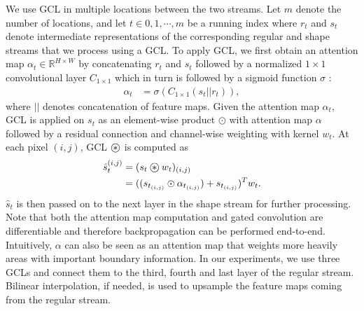 \documentclass[10pt,twocolumn,letterpaper]{article}
\newcommand{\incircbin}[1]{\mathbin{\mathchoice {\protect\incircint{\displaystyle}{#1}}{\protect\incircint{\textstyle}{#1}}{\protect\incircint{\scriptstyle}{#1}}{\protect\incircint{\scriptscriptstyle}{#1}}}}
\newcommand{\incircint}[2]{\ooalign{$#1\bigcirc$\crcr\hidewidth$#1#2$\hidewidth\crcr}}
\newcommand{\gatedconv}{\incircbin{*}}
\begin{document}
We use GCL in multiple locations between the two streams.  Let $m$ denote the number of locations, and 
let $t \in {0,1,\cdots,m}$ be a running index where $r_t$ and $s_t$ denote intermediate representations of the corresponding regular and shape streams that we process using a GCL.
To apply GCL, we first obtain an attention map $\alpha_t \in \mathbb{R}^{H\times W}$ by concatenating $r_t$ and $s_t$ followed by a normalized $1\times1$ convolutional layer $C_{1\times1}$ which in turn is followed by a sigmoid function $\sigma$ :
\vspace{-2mm}
\begin{align}
    \alpha_t &= \sigma(C_{1\times1}(s_t || r_t)), \label{eqn:attention}
\end{align}
where $||$ denotes concatenation of feature maps.
Given the attention map $\alpha_t$, GCL is applied on $s_t$ as an element-wise product $\odot$ with attention map $\alpha$ followed by a residual connection and channel-wise weighting with kernel $w_t$. At each pixel $(i,j)$, GCL $\gatedconv$ is computed as
\vspace{-2mm}
\begin{align}
\begin{aligned}
\hat{s}_{t}^{(i,j)}& = {(s_t \gatedconv w_t)_{(i,j)}}  \\
	           & = ((s_{t_{(i,j)}} \odot \alpha_{t_{(i,j)}}) + s_{t_{(i,j)}})^T w_t.
\label{eqn:gated_conv}
\end{aligned}
\end{align}
$\hat{s}_t$ is then passed on to the next layer in the shape stream for further processing.
Note that both the attention map computation and gated convolution are differentiable and therefore backpropagation can be performed end-to-end. 
Intuitively, $\alpha$ can also be seen as an attention map that weights more heavily areas with important boundary information. 
In our experiments, we  use three GCLs and connect them to the third, fourth and last layer of the regular stream. Bilinear interpolation, if needed,  is used to upsample the feature maps coming from the regular stream.
\end{document}
